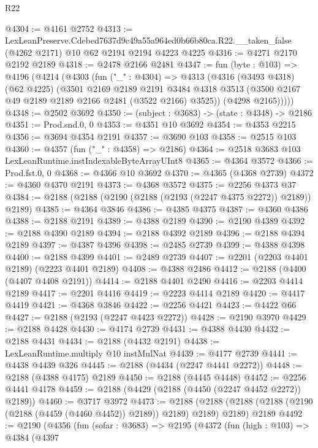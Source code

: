 \begin{lexlean}{R22}
\begin{coremodule}
@4304 := @4161 @2752
@4313 := LexLeanPreserve.Cdebed7637d9c49a55a964ed0b66b80ca.R22.__taken_false
    (@4262 @2171)
    @10
    @62
    @2194
    @2194
    @4223
    @4225
@4316 := @4271 @2170 @2192 @2189
@4318 := @2478 @2166 @2481
@4347 := fun (byte : @103) =>
  @4196
    (@4214
      (@4303
        (fun ("_" : @4304) =>
        @4313
          (@4316
            (@3493 @4318)
            (@62 @4225)
            (@3501
              @2169
              @2189
              @2191
              @3484
              @4318
              @3513
              (@3500 @2167 @49 @2189 @2189 @2166 @2481 (@3522 @2166) @3525))
            (@4298 @2165)))))
@4348 := @2502 @3692
@4350 := (subject : @3683) -> (state : @4348) -> @2186
@4351 := Prod.snd.{0, 0}
@4353 := @4351 @10 @3692
@4354 := @4353 @2215
@4356 := @3694 @4354 @2191
@4357 := @3690 @103
@4358 := @2515 @103
@4360 := @4357 (fun ("_" : @4358) => @2186)
@4364 := @2518 @3683 @103 LexLeanRuntime.instIndexableByteArrayUInt8
@4365 := @4364 @3572
@4366 := Prod.fst.{0, 0}
@4368 := @4366 @10 @3692
@4370 := @4365 (@4368 @2739)
@4372 := @4360 @4370 @2191
@4373 := @4368 @3572
@4375 := @2256 @4373 @37
@4384 := @2188 (@2188 (@2190 (@2188 (@2193 (@2247 @4375 @2272)) @2189)) @2189)
@4385 := @4364 @3846
@4386 := @4385 @4375
@4387 := @4360 @4386
@4388 := @2188 @2191
@4389 := @4388 @2189
@4390 := @2190 @4389
@4392 := @2188 @4390 @2189
@4394 := @2188 @4392 @2189
@4396 := @2188 @4394 @2189
@4397 := @4387 @4396
@4398 := @2485 @2739
@4399 := @4388 @4398
@4400 := @2188 @4399
@4401 := @2489 @2739
@4407 := @2201 (@2203 @4401 @2189) (@2223 @4401 @2189)
@4408 := @4388 @2486
@4412 := @2188 (@4400 (@4407 @4408 @2191))
@4414 := @2188 @4401 @2490
@4416 := @2203 @4414 @2189
@4417 := @2201 @4416
@4419 := @2223 @4414 @2189
@4420 := @4417 @4419
@4421 := @4368 @3846
@4422 := @2256 @4421
@4423 := @4422 @66
@4427 := @2188 (@2193 (@2247 @4423 @2272))
@4428 := @2190 @3970
@4429 := @2188 @4428
@4430 := @4174 @2739
@4431 := @4388 @4430
@4432 := @2188 @4431
@4434 := @2188 (@4432 @2191)
@4438 := LexLeanRuntime.multiply @10 instMulNat
@4439 := @4177 @2739
@4441 := @4438 @4439 @326
@4445 := @2188 (@4434 (@2247 @4441 @2272))
@4448 := @2188 (@4388 @4175) @2189
@4450 := @2188 (@4445 @4448)
@4452 := @2256 @4441 @4178
@4459 := @2188 (@4429 (@2188 (@4450 (@2247 @4452 @2272)) @2189))
@4460 := @3717 @3972
@4473 := @2188
    (@2188 (@2188 (@2188 (@2190 (@2188 (@4459 (@4460 @4452)) @2189)) @2189) @2189) @2189)
    @2189
@4492 := @2190
    (@4356
      (fun (sofar : @3683) =>
      @2195
        (@4372
          (fun (high : @103) =>
          @4384
            (@4397

\end{coremodule}
\end{lexlean}
